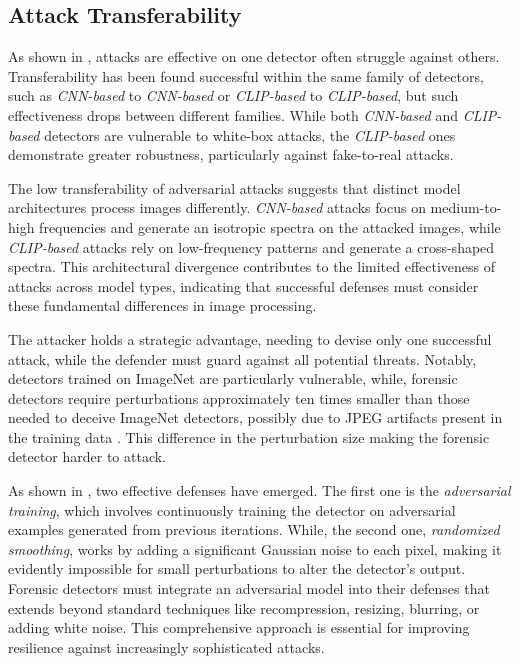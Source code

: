 \documentclass[conference]{IEEEtran} %
\begin{document}
    \subsection{Attack Transferability}
        As shown in \cite{de2024exploring}, attacks are effective on one detector often struggle against others. Transferability has been found successful within the same family of detectors, such as \textit{CNN-based} to \textit{CNN-based} or \textit{CLIP-based} to \textit{CLIP-based}, but such effectiveness drops between different families. While both \textit{CNN-based} and \textit{CLIP-based} detectors are vulnerable to white-box attacks, the \textit{CLIP-based} ones demonstrate greater robustness, particularly against fake-to-real attacks.
        
        The low transferability of adversarial attacks suggests that distinct model architectures process images differently. \textit{CNN-based} attacks focus on medium-to-high frequencies and generate an isotropic spectra on the attacked images, while \textit{CLIP-based} attacks rely on low-frequency patterns and generate a cross-shaped spectra. This architectural divergence contributes to the limited effectiveness of attacks across model types, indicating that successful defenses must consider these fundamental differences in image processing.
        
        The attacker holds a strategic advantage, needing to devise only one successful attack, while the defender must guard against all potential threats. Notably, detectors trained on ImageNet \cite{denglarge} are particularly vulnerable, while, forensic detectors require perturbations approximately ten times smaller than those needed to deceive ImageNet detectors, possibly due to JPEG artifacts present in the training data \cite{de2024exploring}. This difference in the perturbation size making the forensic detector harder to attack.
        
        As shown in \cite{de2024exploring}, two effective defenses have emerged. The first one is the \textit{adversarial training}, which involves continuously training the detector on adversarial examples generated from previous iterations. While, the second one, \textit{randomized smoothing}, works by adding a significant Gaussian noise to each pixel, making it evidently impossible for small perturbations to alter the detector's output. Forensic detectors must integrate an adversarial model into their defenses that extends beyond standard techniques like recompression, resizing, blurring, or adding white noise. This comprehensive approach is essential for improving resilience against increasingly sophisticated attacks.
\end{document}
